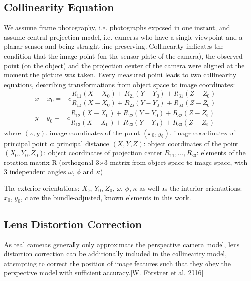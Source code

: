 \subsection{Collinearity Equation}
\label{subsec:2.2.1.Collinearity}
We assume frame photography, i.e. photographs exposed in one instant, and assume central projection model, i.e. cameras who have a single viewpoint and a planar sensor and being straight line-preserving. Collinearity indicates the condition that the image point (on the sensor plate of the camera), the observed point (on the object) and the projection center of the camera were aligned at the moment the picture was taken. Every measured point leads to two collinearity equations, describing transformations from object space to image coordinates:
\begin{equation} %
\begin{split}
x - x_0 = -c \dfrac {R_{11}(X-X_0) + R_{21}(Y-Y_0) + R_{31}(Z-Z_0)} {R_{13}(X-X_0) + R_{23}(Y-Y_0) + R_{33}(Z-Z_0)} \\
y - y_0 = -c \dfrac {R_{12}(X-X_0) + R_{22}(Y-Y_0) + R_{32}(Z-Z_0)} {R_{13}(X-X_0) + R_{23}(Y-Y_0) + R_{33}(Z-Z_0)}
\end{split}
\end{equation}
where\newline
$(x, y)$: image coordinates of the point \newline
$(x_0, y_0)$: image coordinates of principal point \newline
$c$: principal distance \newline
$(X, Y, Z)$: object coordinates of the point \newline
$(X_0, Y_0, Z_0)$: object coordinates of projection center \newline
$R_{11},...,R_{33}$: elements of the rotation matrix R (orthogonal 3$\times$3-matrix from object space to image space, with 3 independent angles $\omega$, $\phi$ and $\kappa$)

The exterior orientations: $X_0$, $Y_0$, $Z_0$, $\omega$, $\phi$, $\kappa$ as well as the interior orientations: $x_0$, $y_0$, $c$ are the bundle-adjusted, known elements in this work.

\subsection{Lens Distortion Correction}
\label{subsec:2.2.2.LensDistortion}

As real cameras generally only approximate the perspective camera model, lens distortion correction can be additionally included in the collinearity model, attempting to correct the position of image features such that they obey the perspective model with sufficient accuracy.[W. Förstner et al. 2016] 

